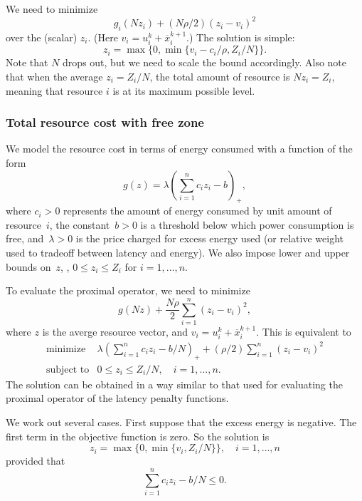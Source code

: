 We need to minimize 
\[
g_i(Nz_i)  +(N\rho/2)(z_i - v_i)^2
\]
over the (scalar) $z_i$. (Here $v_i = u^k_i + \overline x^{k+1}_i$.)
The solution is simple:
\[
    z_i = \max \{0, \min \{ v_i - c_i/\rho, Z_i/N\} \}.
\]
Note that $N$ drops out, but we need to scale the bound accordingly.
Also note that when the average $z_i = Z_i/N$, the total amount of
resource is $N z_i=Z_i$, meaning 
that resource $i$ is at its maximum possible level.


\subsubsection{Total resource cost with free zone}
We model the resource cost in terms of energy consumed with a function 
of the form
\[
    g(z) = \lambda \left(\sum_{i=1}^n c_i z_i - b\right)_+,
\]
where $c_i>0$ represents the amount of energy consumed by
unit amount of resource~$i$, 
the constant~$b>0$ is a threshold below which power consumption is free,
and~$\lambda>0$ is the price charged for excess energy used
(or relative weight used to tradeoff between latency and energy).
We also impose lower and upper bounds on~$z$, \ie, $0\leq z_i\leq Z_i$
for $i=1,\ldots, n$.

To evaluate the proximal operator, we need to minimize
\[
    g(Nz) + \frac{N\rho}{2}\sum_{i=1}^n (z_i-v_i)^2,
\]
where $z$ is the averge resource vector, and
$v_i = u^k_i + \overline x^{k+1}_i$.
This is equivalent to
\[
\begin{array}{ll}
\mbox{minimize} &  \lambda\left(\sum_{i=1}^n c_i z_i - b/N\right)_+
     + (\rho/2)\sum_{i=1}^n (z_i-v_i)^2 \\
\mbox{subject to} & 0\leq z_i \leq Z_i/N, \quad i=1,\ldots,n.
\end{array}
\]
The solution can be obtained in a way similar to that used for evaluating 
the proximal operator of the latency penalty functions.

We work out several cases. 
First suppose that the excess energy is negative. 
The first term in the objective function is zero. 
So the solution is
\[
    z_i = \max\{0, \min\{v_i, Z_i/N\}\}, \quad i=1,\ldots, n
\]
provided that
\[
    \sum_{i=1}^n c_i z_i - b/N \leq 0.
\]

